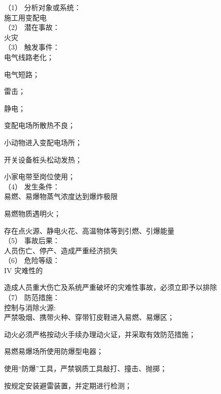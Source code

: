 （1） 分析对象或系统：\\

施工用变配电\\

（2） 潜在事故：\\

火灾\\

（3） 触发事件：\\

 电气线路老化；

 电气短路；

 雷击；

 静电；

 变配电场所散热不良；

 小动物进入变配电场所；

 开关设备桩头松动发热；

小家电带至岗位使用；\\

（4） 发生条件：\\

 易燃、易爆物蒸气浓度达到爆炸极限 

 易燃物质遇明火；

 存在点火源、静电火花、高温物体等到引燃、引爆能量\\

（5） 事故后果：\\

人员伤亡、停产、造成严重经济损失\\

（6） 危险等级：\\

IV 灾难性的

造成人员重大伤亡及系统严重破坏的灾难性事故，必须立即予以排除\\

（7） 防范措施：\\

控制与消除火源:\\

 严禁吸烟、携带火种、穿带钉皮鞋进入易燃、易爆区；

 动火必须严格按动火手续办理动火证，并采取有效防范措施；

 易燃易爆场所使用防爆型电器；

 使用“防爆”工具，严禁钢质工具敲打、撞击、抛掷；

 按规定安装避雷装置，并定期进行检测；

